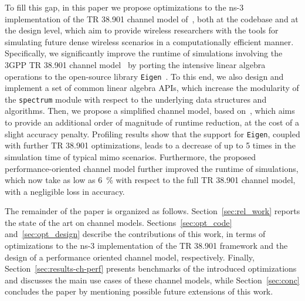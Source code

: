 To fill this gap, in this paper we propose optimizations to the ns-3 implementation of the TR 38.901 channel model of~\cite{tommaso:20}, both at the codebase and at the design level, which aim to provide wireless researchers with the tools for simulating future dense wireless scenarios in a computationally efficient manner. Specifically, we significantly improve the runtime of simulations involving the 3GPP TR 38.901 channel model~\cite{TR38901} by porting the intensive linear algebra operations to the open-source library \texttt{Eigen}~\cite{eigenweb}. To this end, we also design and implement a set of common linear algebra APIs, which increase the modularity of the \texttt{spectrum} module with respect to the underlying data structures and algorithms.
Then, we propose a simplified channel model, based on~\cite{TR38901}, which aims to provide an additional order of magnitude of runtime reduction, at the cost of a slight accuracy penalty. Profiling results show that the support for \texttt{Eigen}, coupled with further TR 38.901 optimizations, leads to a decrease of up to 5 times in the simulation time of typical \gls{mimo} scenarios. Furthermore, the proposed performance-oriented channel model further improved the runtime of simulations, which now take as low as $6$~\% with respect to the full TR 38.901 channel model, with a negligible loss in accuracy.

The remainder of the paper is organized as follows. Section~\ref{sec:rel_work} reports the state of the art on channel models. Sections~\ref{sec:opt_code} and~\ref{sec:opt_design} describe the contributions of this work, in terms of optimizations to the ns-3 implementation of the TR 38.901 framework and the design of a performance oriented channel model, respectively. Finally, Section~\ref{sec:results-ch-perf} presents benchmarks of the introduced optimizations and discusses the main use cases of these channel models, while Section~\ref{sec:conc} concludes the paper by mentioning possible future extensions of this work. 

